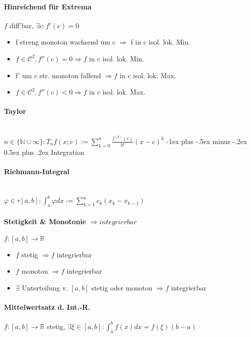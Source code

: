 \documentclass[paper=a3,paper=landscape, fontsize=9pt,DIV=25]{scrartcl}
\makeatletter
\newcommand{\real}{{\mathbb{R}}}
\newcommand{\nat}{\mathbb{N}}
\renewcommand{\section}{\@startsection{section}{1}{0mm}%
                                {-1ex plus -.5ex minus -.2ex}%
                                {0.5ex plus .2ex}%
                                {\normalfont\large\bfseries}}
\makeatother
\begin{document}
\begin{multicols*}{4}
			\paragraph{Hinreichend für Extrema}
			$f$ diff'bar, $\exists c: f'(c)=0$
		\begin{itemize}
			\item f streng monoton wachsend um c $\Rightarrow$ f in c isol. lok. Min.
			\item $f \in \mathscr{C}^2, f''(c)=0 \Rightarrow f$ in c isol. lok. Min.
			\item f' um c str. monoton fallend $\Rightarrow f$ in c isol. lok. Max.
			\item $f \in \mathscr{C}^2, f''(c)<0 \Rightarrow f$ in c isol. lok. Max.
		\end{itemize}
	\paragraph{Taylor}\hspace{0pt} \\
	$ n \in \{\nat \cup \infty\}: T_nf(x;c):= \sum_{k=0}^{n}\frac{f^{(k)}(c)}{k!}(x-c)^k$
	\section{Integration}
	\paragraph{Riehmann-Integral}\hspace{0pt} \\
	$\varphi \in \tau [a,b]: \int_{a}^{b}\varphi dx := \sum_{k=1}^{n}c_k(x_k-x_{k-1})$
	\paragraph{Stetigkeit \& Monotonie $\Rightarrow integrierbar$} $f: [a,b] \rightarrow \real$
	\begin{itemize}
		\item $f$ stetig $\Rightarrow f$ integrierbar
		\item $f$ monoton $\Rightarrow f$ integrierbar
		\item $\exists$ Unterteilung v. $[a,b]$ stetig oder monoton $\Rightarrow f$ integrierbar 
	\end{itemize}
        \paragraph{Mittelwertsatz d. Int.-R.}
        $f:[a,b] \rightarrow \real$ stetig, $\exists \xi \in [a,b]: \int_{a}^{b}f(x)dx=f(\xi)(b-a)$

\end{multicols*}
\end{document}
